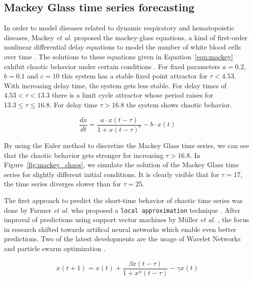 \documentclass{article}
\begin{document}
\subsection{Mackey Glass time series forecasting}

In order to model diseases related to dynamic respiratory and hematopoietic
diseases, Mackey \textit{et al.} proposed the mackey-glass equations, a kind of
first-order nonlinear differential delay equations to model 
the number of white blood cells over time \cite{mackey1977}. The solutions to 
these equations given in Equation~\ref{equ:mackey}
exhibit chaotic behavior under certain conditions \cite{farmer1982}. For fixed 
parameters $a = 0.2$, $b=0.1$ and $c=10$ this system has a stable fixed point 
attractor for $\tau < 4.53$. With increasing delay time, the system gets less 
stable. For delay times of $4.53 < \tau < 13.3$ there is a limit cycle attractor
whose period raises for $13.3 \leq \tau \leq 16.8$. For delay time 
$\tau > 16.8$ the system shows chaotic behavior.

\begin{equation}
  \frac{dx}{dt} = \frac{a \cdot x(t - \tau)}{1 + x(t - \tau)^c} - b \cdot x(t)
  \label{equ:mackey}
\end{equation}

By using the Euler method to discretize the Mackey Glass time series, we can
see that the chaotic behavior gets stronger for increasing $\tau > 16.8$. In 
Figure~\ref{fig:mackey_chaos}, we simulate the solution of the Mackey Glass 
time series for slightly different initial conditions. It is clearly visible
that for $\tau = 17$, the time series diverges slower than for $\tau = 25$.

The first approach to predict the short-time behavior of chaotic time series
was done by Farmer \textit{et al.} who proposed a \texttt{local approximation}
technique \cite{farmer1987}. After improval of predictions using support vector
machines by Müller \textit{et al.} \cite{muller1997}, the focus in research
shifted towards artifical neural networks which enable even better predictions.
Two of the latest developments are the usage of Wavelet Networks
\cite{alexandridis2013} and particle swarm optimization \cite{caraballo2016}.

\begin{equation}
  x(t+1) = x(t) + \frac{\beta x(t - \tau)}{1 + x^{n}(t - \tau)} - \gamma x(t)
  \label{equ:mackey_euler}
\end{equation}
\end{document}
